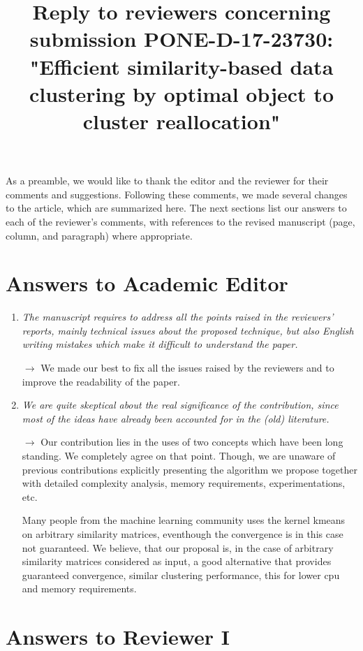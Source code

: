 \documentclass[10pt]{article}
\title{Reply to reviewers concerning submission PONE-D-17-23730: "Efficient similarity-based data clustering by optimal object to cluster reallocation"}
\begin{document}
\maketitle

As a preamble, we would like to thank the editor and the reviewer for their comments and suggestions. Following these comments, we made several changes to the article, which are summarized here. The next sections list our answers to each of the reviewer’s comments, with references to the revised manuscript (page, column, and paragraph) where appropriate.

\section{Answers to Academic Editor}

\begin{enumerate}

\item \emph{The manuscript requires to address all the points raised in the reviewers' reports, mainly technical issues about the proposed technique, but also English writing mistakes which make it difficult to understand the paper.}

$\rightarrow$ We made our best to fix all the issues raised by the reviewers and to improve the readability of the paper.


\item \emph{
We are quite skeptical about the real significance of the contribution, since most of the ideas have already been accounted for in the (old) literature.}

$\rightarrow$ Our contribution lies in the uses of two concepts which have been long standing. We completely agree on that point. Though, we are unaware of previous contributions explicitly presenting the algorithm we propose together with detailed complexity analysis, memory requirements, experimentations, etc.

Many people from the machine learning community uses the kernel kmeans on arbitrary similarity matrices, eventhough the convergence is in this case not guaranteed. We believe, that our proposal is, in the case of arbitrary similarity matrices considered as input, a good alternative that provides guaranteed convergence, similar clustering performance, this for lower cpu and memory requirements.

\end{enumerate}

\section{Answers to Reviewer I}
\end{document}
